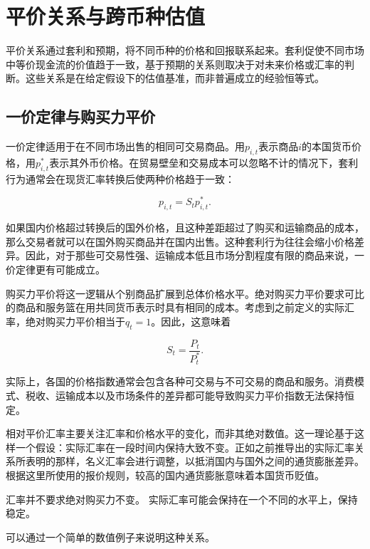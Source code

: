 \section{平价关系与跨币种估值}

平价关系通过套利和预期，将不同币种的价格和回报联系起来。套利促使不同市场中等价现金流的价值趋于一致，基于预期的关系则取决于对未来价格或汇率的判断。这些关系是在给定假设下的估值基准，而非普遍成立的经验恒等式。

\subsection{一价定律与购买力平价}

一价定律适用于在不同市场出售的相同可交易商品。用$p_{i,t}$表示商品$i$的本国货币价格，用$p_{i,t}^{*}$表示其外币价格。在贸易壁垒和交易成本可以忽略不计的情况下，套利行为通常会在现货汇率转换后使两种价格趋于一致：

\begin{equation}
p_{i,t}=S_t p_{i,t}^{*}.
\label{eq:ch10-law-of-one-price}
\end{equation}

如果国内价格超过转换后的国外价格，且这种差距超过了购买和运输商品的成本，那么交易者就可以在国外购买商品并在国内出售。这种套利行为往往会缩小价格差异。因此，对于那些可交易性强、运输成本低且市场分割程度有限的商品来说，一价定律更有可能成立。

购买力平价将这一逻辑从个别商品扩展到总体价格水平。绝对购买力平价要求可比的商品和服务篮在用共同货币表示时具有相同的成本。考虑到之前定义的实际汇率，绝对购买力平价相当于$q_t=1$。因此，这意味着

\begin{equation}
S_t=\frac{P_t}{P_t^{*}}.
\label{eq:ch10-absolute-ppp}
\end{equation}

实际上，各国的价格指数通常会包含各种可交易与不可交易的商品和服务。消费模式、税收、运输成本以及市场条件的差异都可能导致购买力平价指数无法保持恒定。

相对平价汇率主要关注汇率和价格水平的变化，而非其绝对数值。这一理论基于这样一个假设：实际汇率在一段时间内保持大致不变。正如之前推导出的实际汇率关系所表明的那样，名义汇率会进行调整，以抵消国内与国外之间的通货膨胀差异。根据这里所使用的报价规则，较高的国内通货膨胀意味着本国货币贬值。

汇率并不要求绝对购买力不变。
实际汇率可能会保持在一个不同的水平上，保持稳定。

可以通过一个简单的数值例子来说明这种关系。

